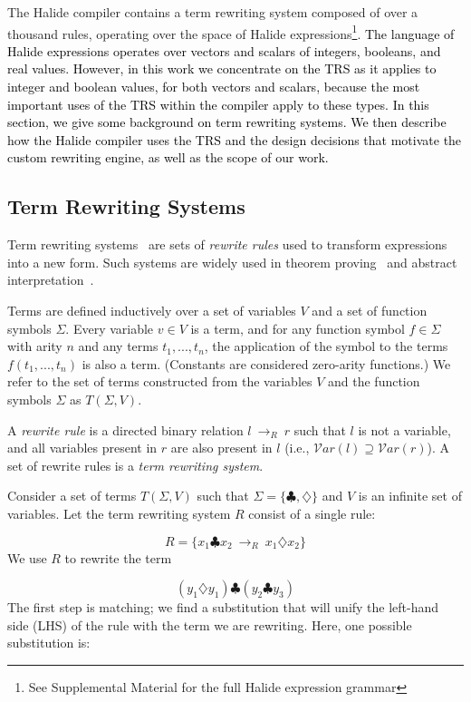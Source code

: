 \documentclass[acmsmall]{acmart}\settopmatter{}
\newcommand{\modified}[1]{\textcolor{black}{{#1}}}
\newcommand{\rewrites}[0]{\:\rightarrow_{R}\:}
\begin{document}
The Halide compiler contains a term rewriting system composed of over a thousand
rules, operating over the space of Halide expressions\footnote{See Supplemental Material for
the full Halide expression grammar}.  \modified{The language of Halide expressions
operates over vectors and scalars of integers, booleans, and real values.  However, in
this work we concentrate on the TRS as it applies to integer and boolean values, for
both vectors and scalars, because the most important uses of the TRS within the compiler
apply to these types.  In this section, we give some background on term rewriting systems.
We then describe how the Halide compiler uses the TRS
and the design decisions that motivate the custom rewriting engine, as well as the scope
of our work.}

\subsection{Term Rewriting Systems}
Term rewriting systems~\cite{gorn1967} are sets of \textit{rewrite rules} used to transform expressions into a new form.  Such systems are widely
used in theorem proving~\cite{baader1999term} and abstract interpretation~\cite{cousot1977abstract, cousot1979systematic}.

Terms are defined inductively over a set of variables $V$ and a set of function symbols $\Sigma$. Every variable $v \in V$ is a term, and for any function symbol $f \in \Sigma$ with arity $n$ and any terms $t_1, ..., t_n$, the application of the symbol to the terms $f(t_1, ..., t_n)$ is also a term. (Constants are considered zero-arity functions.) We refer to the set of terms constructed from the variables $V$ and the function symbols $\Sigma$ as $T(\Sigma, V)$.

A \emph{rewrite rule} is a directed binary relation $l \rewrites r$ such that $l$ is not a variable, and all variables present in $r$ are also present in $l$ (i.e., $\mathcal{V}ar(l) \supseteq \mathcal{V}ar(r)$). A set of rewrite rules is a \emph{term rewriting system}.

Consider a set of terms $T(\Sigma, V)$ such that $\Sigma = \{\clubsuit, \diamondsuit\}$ and $V$ is an infinite set of variables. Let the term rewriting system $R$ consist of a single rule:

\[ R = \{ x_1 \clubsuit x_2 \rewrites x_1 \diamondsuit x_2 \} \]
We use $R$ to rewrite the term

\[ 
(y_1 \diamondsuit y_1) \clubsuit (y_2 \clubsuit y_3)
\]
The first step is matching; we find a substitution that will unify the left-hand side (LHS) of the rule with the term we are rewriting. Here, one possible substitution is:
\end{document}
